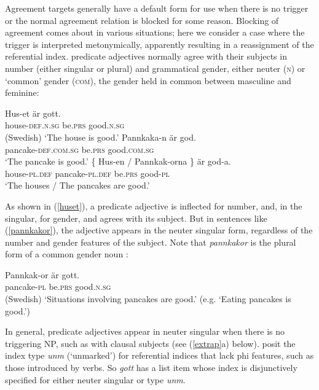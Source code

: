 \documentclass[output=paper,biblatex,babelshorthands,newtxmath,draftmode,colorlinks,citecolor=brown]{langscibook}
\begin{document}
Agreement targets generally have a default form for use when there is no trigger or the normal agreement relation is blocked for some reason.   
Blocking of agreement comes about in various situations; here we  consider a case where the trigger is interpreted metonymically, apparently resulting in a reassignment of the referential index.   predicate adjectives normally agree with their subjects in number (either singular or plural) and grammatical gender, either neuter (\textsc{n}) or `common' gender (\textsc{com}), the gender held in common between masculine and feminine: 

\begin{exe} 
\ex \label{huset}
 \begin{xlist}
\ex 
\gll Hus-et 	är	gott. \\
     house-\textsc{def.n.sg}	be.\textsc{prs}	good.\textsc{n.sg} \\\hfill(Swedish)
\glt	`The house is good.’
\ex   
\gll Pannkaka-n 	         är	         god. \\
     pancake-\textsc{def.com.sg} be.\textsc{prs} good.\textsc{com.sg} \\
\glt	`The pancake is good.’
\ex   
\gll   \{   Hus-en / Pannkak-orna 	\}	är	god-a. \\
	   {}   house-\textsc{pl.def} {} pancake-\textsc{pl.def} {} be.\textsc{prs} good-\textsc{pl}  \\
\glt	`The houses / The pancakes are good.’
\end{xlist}
\end{exe}

\noindent
As shown in (\ref{huset}), a predicate adjective is inflected for number, and, in the singular, for gender, and agrees with its subject. But in sentences like (\ref{pannkakor}), the adjective appears in the neuter singular form, regardless of the number and gender features of the subject.  Note that \textit{pannkakor} is the plural form of a common gender noun \citep{Faarlund:1977, Enger:2004,Josefsson:2009}:

\begin{exe} 
\ex \label{pannkakor}\label{ex-pannkakor-aer-gott}
\gll   Pannkak-or 	är	gott. \\
	pancake-\textsc{pl}	be.\textsc{prs}	good.\textsc{n.sg} \\\hfill(Swedish)
\glt	`Situations involving pancakes are good.’ (e.g. `Eating pancakes is good.’)
\end{exe}

\noindent
In general,  predicate adjectives appear in neuter singular when there is no triggering NP, such as with clausal subjects (see (\ref{extrap}a) below).  \citet[154]{Wechsler+Zlatic:2003} posit the index type \textit{unm} (`unmarked') for  referential indices that lack phi features, such as those introduced by verbs.   So \textit{gott} has a \subj list item whose index  is disjunctively specified for either neuter singular or type \textit{unm}.  
\end{document}
